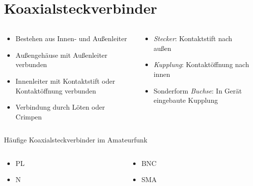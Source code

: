 
\section{Koaxialsteckverbinder}
\label{section:koaxsteckverbinder}
\begin{frame}%

\begin{columns}
    \begin{column}{0.48\textwidth}
    \begin{itemize}
  \item Bestehen aus Innen- und Außenleiter
  \item Außengehäuse mit Außenleiter verbunden
  \item Innenleiter mit Kontaktstift oder Kontaktöffnung verbunden
  \item Verbindung durch Löten oder Crimpen
  \end{itemize}

    \end{column}
   \begin{column}{0.48\textwidth}
       \begin{itemize}
  \item \emph{Stecker}: Kontaktstift nach außen
  \item \emph{Kupplung}: Kontaktöffnung nach innen
  \item Sonderform \emph{Buchse}: In Gerät eingebaute Kupplung
  \end{itemize}

   \end{column}
\end{columns}

\end{frame}

\begin{frame}Häufige Koaxialsteckverbinder im Amateurfunk
\begin{columns}
    \begin{column}{0.48\textwidth}
    \begin{itemize}
  \item PL
  \item N
  \end{itemize}

    \end{column}
   \begin{column}{0.48\textwidth}
       \begin{itemize}
  \item BNC
  \item SMA
  \end{itemize}

   \end{column}
\end{columns}

\end{frame}

